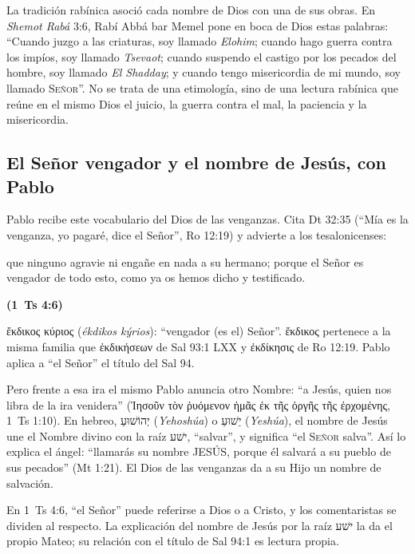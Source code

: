 \documentclass[11pt,letterpaper]{article}
\newcommand{\heb}[1]{\mbox{\foreignlanguage{hebrew}{#1}}}
\newcommand{\grc}[1]{\foreignlanguage{ancientgreek}{#1}}
\newcommand{\SENOR}{\textsc{Señor}}
\newcommand{\fuente}[1]{\par\hfill{\upshape\bfseries\small\textcolor{azul}{#1}}}
\begin{document}
\begin{nota}[Precisión]
La tradición rabínica asoció cada nombre de Dios con una de sus obras. En \emph{Shemot Rabá} 3:6, Rabí Abbá bar Memel pone en boca de Dios estas palabras: ``Cuando juzgo a las criaturas, soy llamado \emph{Elohim}; cuando hago guerra contra los impíos, soy llamado \emph{Tsevaot}; cuando suspendo el castigo por los pecados del hombre, soy llamado \emph{El Shadday}; y cuando tengo misericordia de mi mundo, soy llamado \SENOR{}''. No se trata de una etimología, sino de una lectura rabínica que reúne en el mismo Dios el juicio, la guerra contra el mal, la paciencia y la misericordia.
\end{nota}

\subsection{El Señor vengador y el nombre de Jesús, con Pablo}
Pablo recibe este vocabulario del Dios de las venganzas. Cita Dt 32:35 (``Mía es la venganza, yo pagaré, dice el Señor'', Ro 12:19) y advierte a los tesalonicenses:

\begin{cita}que ninguno agravie ni engañe en nada a su hermano; porque el Señor es vengador de todo esto, como ya os hemos dicho y testificado.\fuente{(1~Ts 4:6)}\end{cita}

\begin{filologia}[1~Ts 4:6]
\grc{ἔκδικος κύριος} (\emph{ékdikos kýrios}): ``vengador (es el) Señor''. \grc{ἔκδικος} pertenece a la misma familia que \grc{ἐκδικήσεων} de Sal 93:1 LXX y \grc{ἐκδίκησις} de Ro 12:19. Pablo aplica a ``el Señor'' el título del Sal 94.
\end{filologia}

Pero frente a esa ira el mismo Pablo anuncia otro Nombre: ``a Jesús, quien nos libra de la ira venidera'' (\grc{Ἰησοῦν τὸν ῥυόμενον ἡμᾶς ἐκ τῆς ὀργῆς τῆς ἐρχομένης}, 1~Ts 1:10). En hebreo, \heb{יְהוֹשׁוּעַ} (\emph{Yehoshúa}) o \heb{יֵשׁוּעַ} (\emph{Yeshúa}), el nombre de Jesús une el Nombre divino con la raíz \heb{ישׁע}, ``salvar'', y significa ``el \SENOR{} salva''. Así lo explica el ángel: ``llamarás su nombre JESÚS, porque él salvará a su pueblo de sus pecados'' (Mt 1:21). El Dios de las venganzas da a su Hijo un nombre de salvación.

\begin{nota}[Precisión]
En 1~Ts 4:6, ``el Señor'' puede referirse a Dios o a Cristo, y los comentaristas se dividen al respecto. La explicación del nombre de Jesús por la raíz \heb{ישׁע} la da el propio Mateo; su relación con el título de Sal 94:1 es lectura propia.
\end{nota}
\end{document}
